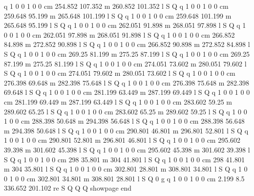 q 1 0 0 1 0 0 cm
254.852 107.352 m 260.852 101.352 l S Q
q 1 0 0 1 0 0 cm
259.648 95.199 m 265.648 101.199 l S Q
q 1 0 0 1 0 0 cm
259.648 101.199 m 265.648 95.199 l S Q
q 1 0 0 1 0 0 cm
262.051 91.898 m 268.051 97.898 l S Q
q 1 0 0 1 0 0 cm
262.051 97.898 m 268.051 91.898 l S Q
q 1 0 0 1 0 0 cm
266.852 84.898 m 272.852 90.898 l S Q
q 1 0 0 1 0 0 cm
266.852 90.898 m 272.852 84.898 l S Q
q 1 0 0 1 0 0 cm
269.25 81.199 m 275.25 87.199 l S Q
q 1 0 0 1 0 0 cm
269.25 87.199 m 275.25 81.199 l S Q
q 1 0 0 1 0 0 cm
274.051 73.602 m 280.051 79.602 l S Q
q 1 0 0 1 0 0 cm
274.051 79.602 m 280.051 73.602 l S Q
q 1 0 0 1 0 0 cm
276.398 69.648 m 282.398 75.648 l S Q
q 1 0 0 1 0 0 cm
276.398 75.648 m 282.398 69.648 l S Q
q 1 0 0 1 0 0 cm
281.199 63.449 m 287.199 69.449 l S Q
q 1 0 0 1 0 0 cm
281.199 69.449 m 287.199 63.449 l S Q
q 1 0 0 1 0 0 cm
283.602 59.25 m 289.602 65.25 l S Q
q 1 0 0 1 0 0 cm
283.602 65.25 m 289.602 59.25 l S Q
q 1 0 0 1 0 0 cm
288.398 50.648 m 294.398 56.648 l S Q
q 1 0 0 1 0 0 cm
288.398 56.648 m 294.398 50.648 l S Q
q 1 0 0 1 0 0 cm
290.801 46.801 m 296.801 52.801 l S Q
q 1 0 0 1 0 0 cm
290.801 52.801 m 296.801 46.801 l S Q
q 1 0 0 1 0 0 cm
295.602 39.398 m 301.602 45.398 l S Q
q 1 0 0 1 0 0 cm
295.602 45.398 m 301.602 39.398 l S Q
q 1 0 0 1 0 0 cm
298 35.801 m 304 41.801 l S Q
q 1 0 0 1 0 0 cm
298 41.801 m 304 35.801 l S Q
q 1 0 0 1 0 0 cm
302.801 28.801 m 308.801 34.801 l S Q
q 1 0 0 1 0 0 cm
302.801 34.801 m 308.801 28.801 l S Q
0 g
q 1 0 0 1 0 0 cm
2.199 8.5 336.652 201.102 re S Q
Q Q
showpage
end
